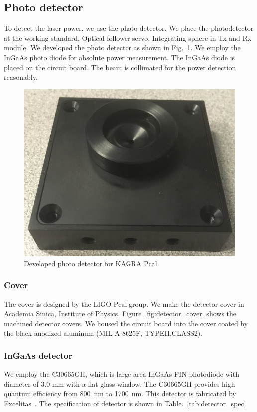 \subsection{Photo detector} \label{PD}
To detect the laser power, we use the photo detector. We place the photodetector at the working standard, Optical follower servo, Integrating sphere in Tx and Rx module.
We developed the photo detector as shown in Fig.~\ref{fig:KAGRA_photodetector}. We employ the InGaAs photo diode for absolute power measurement. The InGaAs diode is placed on the circuit board. The beam is collimated for the power detection reasonably. 

\begin{figure}
\begin{center}
\includegraphics[width=12cm]{Figures/KAGRA_detector.eps}
\caption{Developed photo detector for KAGRA Pcal.} 
\label{fig:KAGRA_photodetector} 
\end{center}
\end{figure}

\subsubsection{Cover}
The cover is designed by the LIGO Pcal group. We make the detector cover in Academia Sinica, Institute of Physics. Figure~\ref{fig:detector_cover} shows the machined detector covers. We housed the circuit board into the cover coated by the black anodized aluminum (MIL-A-8625F, TYPEII,CLASS2). 

\subsubsection{InGaAs detector}	
We employ the C30665GH, which is large area InGaAs PIN photodiode with diameter of 3.0 mm with a flat glass window. The C30665GH provides high quantum efficiency from 800~nm to 1700~nm. This detector is fabricated by Excelitas~\cite{Excelitas}. The specification of detector is shown in Table.~\ref{tab:detector_spec}. 

